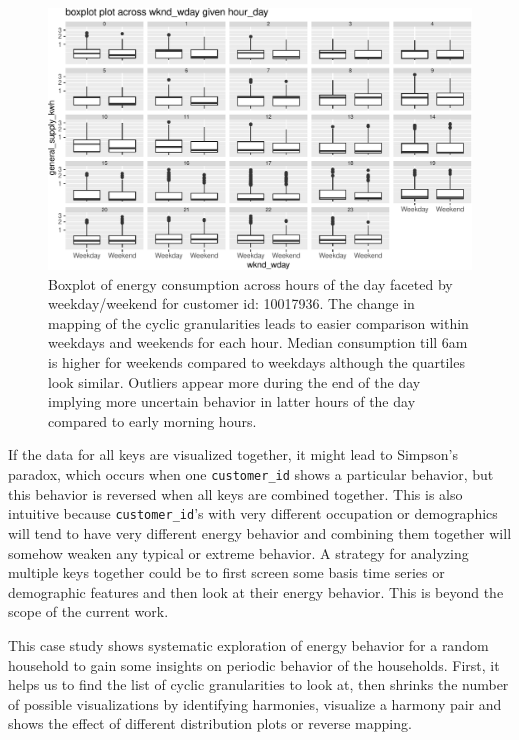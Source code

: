 \documentclass[12pt]{article}
\begin{document}
\begin{figure}

{\centering \includegraphics[width=\textwidth]{figure/cust-ridge-1} 

}

\caption{Boxplot of energy consumption across hours of the day faceted by weekday/weekend for customer id: 10017936. The change in mapping of the cyclic granularities leads to easier comparison within weekdays and weekends for each hour. Median consumption till 6am is higher for weekends compared to weekdays although the quartiles look similar. Outliers appear more during the end of the day implying more uncertain behavior in latter hours of the day compared to early morning hours.}\label{fig:cust-ridge}
\end{figure}

If the data for all keys are visualized together, it might lead to Simpson's paradox, which occurs when one \texttt{customer\_id} shows a particular behavior, but this behavior is reversed when all keys are combined together. This is also intuitive because \texttt{customer\_id}'s with very different occupation or demographics will tend to have very different energy behavior and combining them together will somehow weaken any typical or extreme behavior. A strategy for analyzing multiple keys together could be to first screen some basis time series or demographic features and then look at their energy behavior. This is beyond the scope of the current work.

This case study shows systematic exploration of energy behavior for a random household to gain some insights on periodic behavior of the households. First, it helps us to find the list of cyclic granularities to look at, then shrinks the number of possible visualizations by identifying harmonies, visualize a harmony pair and shows the effect of different distribution plots or reverse mapping.
\end{document}
